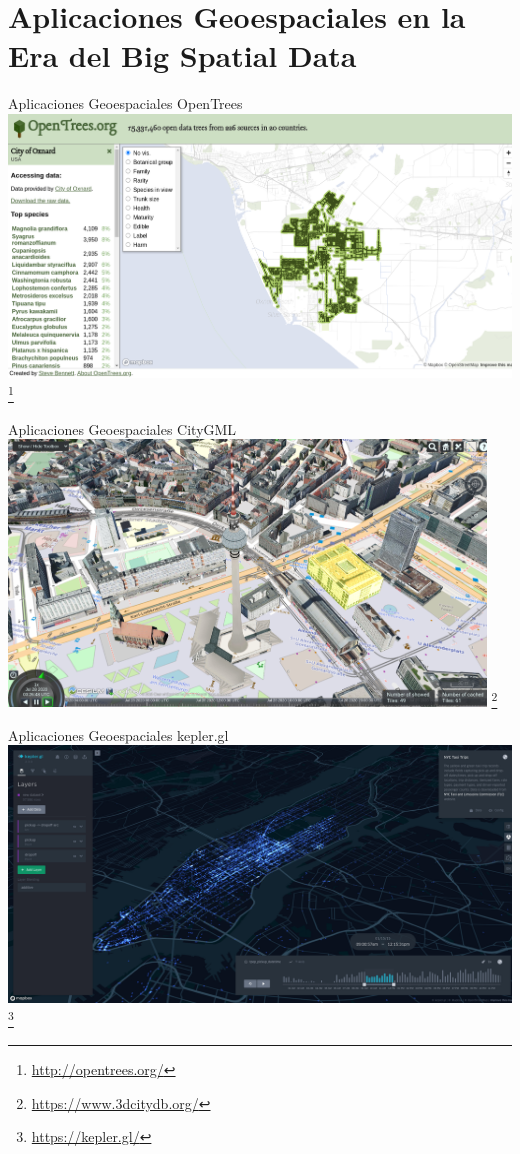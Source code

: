 \documentclass{beamer}
\newcommand\blfootnote[1]{%
  \begingroup
  \renewcommand\thefootnote{}\footnote{#1}%
  \addtocounter{footnote}{-1}%
  \endgroup
}
\begin{document}
\section[Aplicaciones Geoespaciales]{Aplicaciones Geoespaciales en la Era del Big Spatial Data}

\begin{frame}{Aplicaciones Geoespaciales}
    OpenTrees
    \centering
    \includegraphics[width=\textwidth]{figures/opentree}
    \blfootnote{\url{http://opentrees.org/}}
\end{frame}

\begin{frame}{Aplicaciones Geoespaciales}
    CityGML
    \centering
    \includegraphics[width=0.95\textwidth]{figures/citygml}
    \blfootnote{\url{https://www.3dcitydb.org/}}
\end{frame}

\begin{frame}{Aplicaciones Geoespaciales}
    kepler.gl
    \centering
    \includegraphics[width=\textwidth]{figures/kepler}
    \blfootnote{\url{https://kepler.gl/}}
\end{frame}
\end{document}
